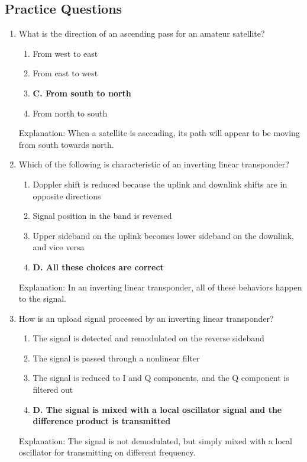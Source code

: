 \subsection*{Practice Questions}
\begin{enumerate}
      \item What is the direction of an ascending pass for an amateur satellite?
    \begin{enumerate}
        \item  From west to east
       \item  From east to west
        \item \textbf{C. From south to north}
        \item  From north to south
    \end{enumerate}
    \textcolor{myred}{Explanation:}
    When a satellite is ascending, its path will appear to be moving from south towards north.
    
    \item Which of the following is characteristic of an inverting linear transponder?
       \begin{enumerate}
        \item  Doppler shift is reduced because the uplink and downlink shifts are in opposite directions
        \item  Signal position in the band is reversed
       \item  Upper sideband on the uplink becomes lower sideband on the downlink, and vice versa
        \item \textbf{D. All these choices are correct}
        \end{enumerate}
       \textcolor{myred}{Explanation:}
      In an inverting linear transponder, all of these behaviors happen to the signal.

     \item How is an upload signal processed by an inverting linear transponder?
     \begin{enumerate}
        \item  The signal is detected and remodulated on the reverse sideband
        \item  The signal is passed through a nonlinear filter
         \item  The signal is reduced to I and Q components, and the Q component is filtered out
        \item \textbf{D. The signal is mixed with a local oscillator signal and the difference product is transmitted}
        \end{enumerate}
    \textcolor{myred}{Explanation:}
    The signal is not demodulated, but simply mixed with a local oscillator for transmitting on different frequency.


\end{enumerate}
